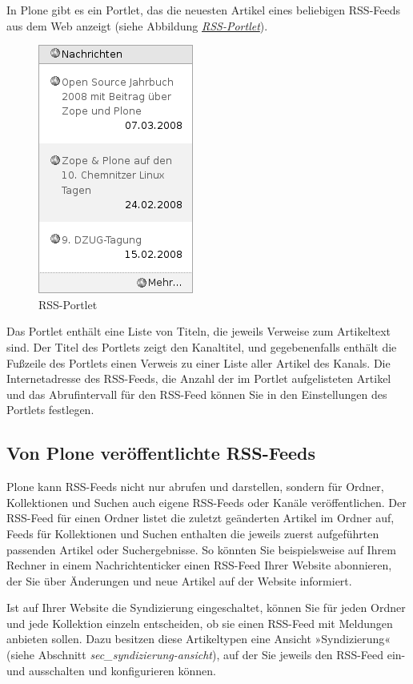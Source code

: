 \documentclass[a4paper,12pt,ngerman]{manual}
\begin{document}
In Plone gibt es ein Portlet, das die neuesten Artikel eines beliebigen
RSS-Feeds aus dem Web anzeigt (siehe Abbildung \hyperlink{fig-portlet-rss}{\emph{RSS-Portlet}}).
\hypertarget{fig-portlet-rss}{}\begin{figure}[htbp]
\centering

\includegraphics{portlet-rss.png}
\caption{RSS-Portlet}\end{figure}

Das Portlet enthält eine Liste von Titeln, die jeweils Verweise zum
Artikeltext sind. Der Titel des Portlets zeigt den Kanaltitel, und
gegebenenfalls enthält die Fußzeile des Portlets einen Verweis zu einer Liste
aller Artikel des Kanals. Die Internetadresse des RSS-Feeds, die Anzahl
der im Portlet aufgelisteten Artikel und das Abrufintervall für den
RSS-Feed können Sie in den Einstellungen des Portlets festlegen.


\subsection{Von Plone veröffentlichte RSS-Feeds}

Plone kann RSS-Feeds nicht nur abrufen und darstellen, sondern für Ordner,
Kollektionen und Suchen auch eigene RSS-Feeds oder Kanäle veröffentlichen.
Der RSS-Feed für einen Ordner listet die zuletzt geänderten Artikel im Ordner
auf, Feeds für Kollektionen und Suchen enthalten die jeweils zuerst
aufgeführten passenden Artikel oder Suchergebnisse. So könnten Sie
beispielsweise auf Ihrem Rechner in einem Nachrichtenticker einen RSS-Feed
Ihrer Website abonnieren, der Sie über Änderungen und neue Artikel auf der
Website informiert.

Ist auf Ihrer Website die Syndizierung eingeschaltet, können Sie für
jeden Ordner und jede Kollektion einzeln entscheiden, ob sie einen
RSS-Feed mit Meldungen anbieten sollen. Dazu besitzen diese
Artikeltypen eine Ansicht »Syndizierung« (siehe Abschnitt
\emph{sec\_syndizierung-ansicht}), auf der Sie jeweils den RSS-Feed
ein- und ausschalten und konfigurieren können.
\end{document}
